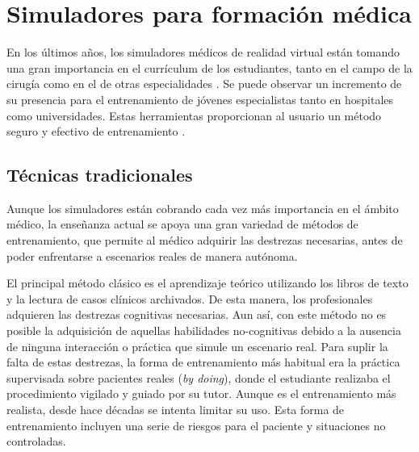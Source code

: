 \section{Simuladores para formación médica}
\label{art:medicalsim}

En los últimos años, los simuladores médicos de realidad virtual están tomando una gran importancia en el currículum de los estudiantes, tanto en el campo de la cirugía como en el de otras especialidades \cite{PATEL2017266.e7}. Se puede observar un incremento de su presencia para el entrenamiento de jóvenes especialistas tanto en hospitales como universidades. Estas herramientas proporcionan al usuario un método seguro y efectivo de entrenamiento \cite{simsafety}.

\subsection{Técnicas tradicionales}

Aunque los simuladores están cobrando cada vez más importancia en el ámbito médico, la enseñanza actual se apoya una gran variedad de métodos de entrenamiento, que permite al médico adquirir las destrezas necesarias, antes de poder enfrentarse a escenarios reales de manera autónoma. 


El principal método clásico es el aprendizaje teórico utilizando los libros de texto y la lectura de casos clínicos archivados. 
De esta manera, los profesionales adquieren las destrezas cognitivas necesarias. Aun así, con este método no es posible la adquisición de aquellas habilidades no-cognitivas debido a la ausencia de ninguna interacción o práctica que simule un escenario real. 
Para suplir la falta de estas destrezas, la forma de entrenamiento más habitual era la práctica supervisada sobre pacientes reales (\emph{by doing}), donde el estudiante realizaba el procedimiento vigilado y guiado por su tutor. Aunque es el entrenamiento más realista, desde hace décadas se intenta limitar su uso. Esta forma de entrenamiento incluyen una serie de riesgos para el paciente y situaciones no controladas. 

